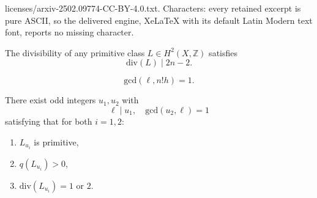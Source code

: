 \documentclass[10pt,a4paper]{amsart}
\newcommand{\BZ}{{\mathbb{Z}}}
\begin{document}
licenses/arxiv-2502.09774-CC-BY-4.0.txt. Characters: every retained excerpt is pure ASCII, so the delivered engine, XeLaTeX with its default Latin Modern text font, reports no missing character.
\begin{lem}\label{lem2.1}
    The divisibility of any primitive class $L \in H^2(X, \BZ)$ satisfies 
\[
\mathrm{div}(L) \mid 2n-2.
\]
\end{lem}

\begin{equation}\label{assumption0}
\mathrm{gcd}(\ell, n!h) = 1.
\end{equation}

\begin{prop}\label{prop2.3}
There exist odd integers $u_1,u_2$ with \[
\ell \mid u_1, \quad \mathrm{gcd}(u_2,\ell)=1
\]
satisfying that for both $i=1,2$:
\begin{enumerate}
    \item[(i)] $L_{u_i}$ is primitive,
    \item[(ii)] $q(L_{u_i}) >0$,
    \item[(iii)] $\mathrm{div}(L_{u_i}) =1$ or $2$.
\end{enumerate}
\end{prop}
\end{document}

